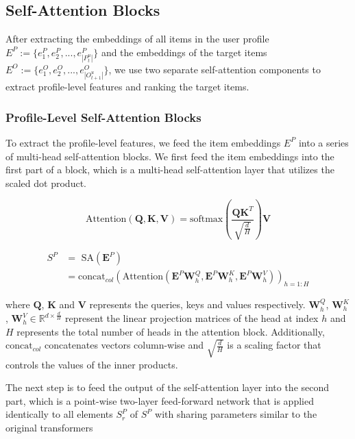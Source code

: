 \documentclass[sigconf,natbib=true]{acmart}
\begin{document}
\subsection{Self-Attention Blocks}

After extracting the embeddings of all items in the user profile $E^{P} := \{e^{P}_{1}, e^{P}_{2}, ..., e^{P}_{|P^{u}_{t}|}\}$ and the embeddings of the target items $E^{O} := \{e^{O}_{1}, e^{O}_{2}, ..., e^{O}_{|O^{u}_{t+1}|}\}$, we use two separate self-attention components to extract profile-level features and ranking the target items.


\subsubsection{Profile-Level Self-Attention Blocks}
To extract the profile-level features, we feed the item embeddings $E^{P}$ into a series of multi-head self-attention blocks. We first feed the item embeddings into the first part of a block, which is a multi-head self-attention layer that utilizes the scaled dot product. \cite{vaswani2017attention}

\begin{equation} 
\textrm{Attention}(\textbf{Q}, \textbf{K}, \textbf{V}) = \textrm{softmax}\left( \frac{\textbf{Q} \textbf{K}^{T}}{\sqrt{\frac{d}{H}}}\right) \textbf{V}
\end{equation} 

\begin{equation} 
\begin{split}
S^{P} &= \textrm{ SA}(\textbf{E}^{P}) \\& = \text{concat}_{col} \left( \textrm{Attention}(\textbf{E}^{P}\textbf{W}^{Q}_{h}, \textbf{E}^{P}\textbf{W}^{K}_{h}, \textbf{E}^{P}\textbf{W}^{V}_{h}) \right)_{h=1:H}
\end{split}
\end{equation} 



\noindent where $\textbf{Q}$, $\textbf{K}$ and $\textbf{V}$ represents the queries, keys and values respectively. $\textbf{W}^{Q}_{h}$, $\textbf{W}^{K}_{h}$, $\textbf{W}^{V}_{h} \in \mathbb{R}^{d \times \frac{d}{H}}$ represent the linear projection matrices of the head at index $h$ and $H$ represents the total number of heads in the attention block. Additionally, $\text{concat}_{col}$ concatenates vectors column-wise and $\sqrt{\frac{d}{H}}$ is a scaling factor that controls the values of the inner products. 

The next step is to feed the output of the self-attention layer into the second part, which is a point-wise two-layer feed-forward network that is applied identically to all elements $S^{P}_r$ of $S^{P}$ with sharing parameters similar to the original transformers \cite{vaswani2017attention}
\end{document}
